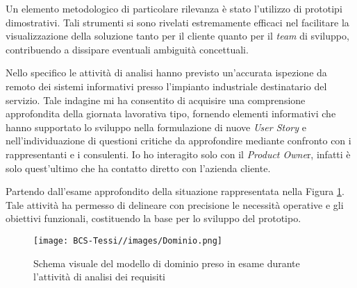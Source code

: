         \vspace{0.2 em}
        \noindent Un elemento metodologico di particolare rilevanza è stato l'utilizzo di prototipi dimostrativi. Tali strumenti si sono rivelati estremamente efficaci nel facilitare la visualizzazione della soluzione tanto per il cliente quanto per il \textit{team} di sviluppo, contribuendo a dissipare eventuali ambiguità concettuali.

        \vspace{0.2 em}
        \noindent Nello specifico le attività di analisi hanno previsto un'accurata ispezione da remoto dei sistemi informativi presso l'impianto industriale destinatario del servizio. Tale indagine mi ha consentito di acquisire una comprensione approfondita della giornata lavorativa tipo, fornendo elementi informativi che hanno supportato lo sviluppo nella formulazione di nuove \textit{User Story} e nell'individuazione di questioni critiche da approfondire mediante confronto con i rappresentanti e i consulenti. Io ho interagito solo con il \textit{Product Owne}r, infatti è solo quest'ultimo che ha contatto diretto con l'azienda cliente.

        \vspace{0.2 em}
        \noindent Partendo dall'esame approfondito della situazione rappresentata nella Figura \ref{fig:Dominio}. Tale attività ha permesso di delineare con precisione le necessità operative e gli obiettivi funzionali, costituendo la base per lo sviluppo del prototipo.

        \begin{figure}
            \centering
            \texttt{[image: BCS-Tessi//images/Dominio.png]}
            \caption[Modello di dominio preso in esame]{Schema visuale del modello di dominio preso in esame durante l'attività di analisi dei requisiti}
            \label{fig:Dominio}
        \end{figure}

